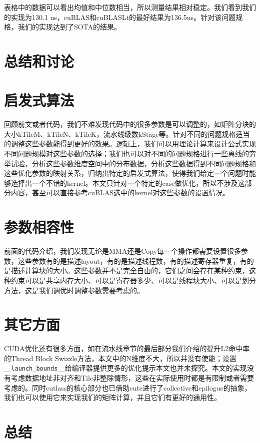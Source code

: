 表格中的数据可以看出均值和中位数相当，所以测量结果相对稳定。我们看到我们的实现为130.1 us，cuBLAS和cuBLASLt的最好结果为136.5us。针对该问题规格，我们的实现达到了SOTA的结果。

\section{总结和讨论}

\section{启发式算法}

回顾前文或者代码，我们不难发现代码中的很多参数是可以调整的，如矩阵分块的大小kTileM、kTileN、kTileK，流水线级数kStage等。针对不同的问题规格适当的调整这些参数能得到更好的效果。逻辑上，我们可以用理论计算来设计公式实现不同问题规模对这些参数的选择；我们也可以对不同的问题规格进行一些离线的穷举试验，分析这些参数维度空间中的分布数据，分析这些数据得到不同问题规格和这些优化参数的映射关系，归纳出特定的启发式算法，使得我们给定一个问题时能够选择出一个不错的kernel。本文只针对一个特定的case做优化，所以不涉及这部分内容，甚至可以直接参考cuBLAS选中的kernel对这些参数的设置情况。

\section{参数相容性}

前面的代码介绍，我们发现无论是MMA还是Copy每一个操作都需要设置很多参数，这些参数有的是描述layout，有的是描述线程数，有的描述寄存器重复，有的是描述计算块的大小。这些参数并不是完全自由的，它们之间会存在某种约束，这种约束可以是共享内存大小、可以是寄存器多少、可以是线程块大小、可以是划分方法，这是我们调优时调整参数需要考虑的。

\section{其它方面}

CUDA优化还有很多方面，如在流水线章节的最后部分我们介绍的提升L2命中率的Thread Block Swizzle方法，本文中的N维度不大，所以并没有使能；设置\lstinline|__launch_bounds__|给编译器提供更多的优化提示本文也并未探究。本文的实现没有考虑数据地址非对齐和Tile非整除情形，这些在实际使用时都是有限制或者需要考虑的。同时cutlass的核心部分也已借助cute进行了collective和epilogue的抽象，我们也可以使用它来实现我们的矩阵计算，并且它们有更好的通用性。

\section{总结}

